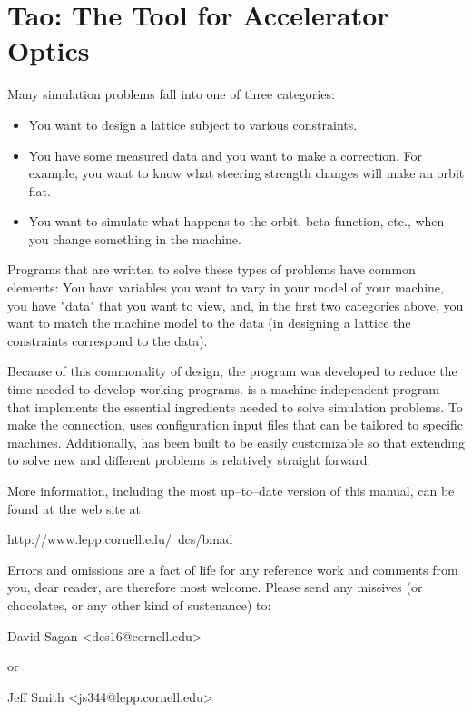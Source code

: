 \section*{Tao: The Tool for Accelerator Optics}

Many simulation problems fall into one of three categories: 

\begin{itemize}
\item 
You want to design a lattice subject to various constraints.
\item 
You have some measured data and you want to make a correction. For
example, you want to know what steering strength changes will make an orbit
flat.
\item
You want to simulate what happens to the orbit, beta function,
etc., when you change something in the machine.
\end{itemize}

Programs that are written to solve these types of problems have common
elements: You have variables you want to vary in your model of your
machine, you have "data" that you want to view, and, in the first two
categories above, you want to match the machine model to the data (in
designing a lattice the constraints correspond to the data).

Because of this commonality of design, the \tao program was developed
to reduce the time needed to develop working programs. \tao is a
machine independent program that implements the essential ingredients
needed to solve simulation problems. To make the
connection, \tao uses configuration input files that can be tailored to
specific machines. Additionally, \tao has been built
to be easily customizable so that extending \tao to solve new and
different problems is relatively straight forward.

More information, including the most up--to--date version of this
manual, can be found at the \bmad web site at
\begin{example}
  http://www.lepp.cornell.edu/~dcs/bmad
\end{example}

Errors and omissions are a fact of life for any reference work and
comments from you, dear reader, are therefore most welcome. Please
send any missives (or chocolates, or any other kind of sustenance) to:
\begin{example}
  David Sagan <dcs16@cornell.edu>
\end{example}
or
\begin{example}
  Jeff Smith <js344@lepp.cornell.edu>
\end{example}
